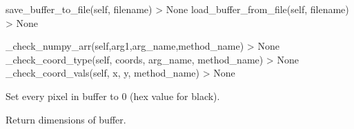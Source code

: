 \documentclass[letterpaper,10pt,english]{sphinxmanual}
\begin{document}
\begin{fulllineitems}
\begin{fulllineitems}
\end{fulllineitems}



\begin{fulllineitems}

\pysigstartsignatures
{}
\pysigstopsignatures
\sphinxAtStartPar
save\_buffer\_to\_file(self, filename) \sphinxhyphen{}\textgreater{} None
load\_buffer\_from\_file(self, filename) \sphinxhyphen{}\textgreater{} None

\end{fulllineitems}



\begin{fulllineitems}

\pysigstartsignatures
{}
\pysigstopsignatures
\sphinxAtStartPar
\_check\_numpy\_arr(self,arg1,arg\_name,method\_name) \sphinxhyphen{}\textgreater{} None
\_check\_coord\_type(self, coords, arg\_name, method\_name) \sphinxhyphen{}\textgreater{} None
\_check\_coord\_vals(self, x, y, method\_name) \sphinxhyphen{}\textgreater{} None

\end{fulllineitems}


\begin{fulllineitems}
\label{\detokenize{vbuffer:vbuffer.VBuffer.clear}}
\pysigstartsignatures
{}
\pysigstopsignatures
\sphinxAtStartPar
Set every pixel in buffer to 0 (hex value for black).

\end{fulllineitems}


\begin{fulllineitems}
\label{\detokenize{vbuffer:vbuffer.VBuffer.dimensions}}
\pysigstartsignatures
{}
\pysigstopsignatures
\sphinxAtStartPar
Return dimensions of buffer.

\end{fulllineitems}


\end{fulllineitems}
\end{document}
